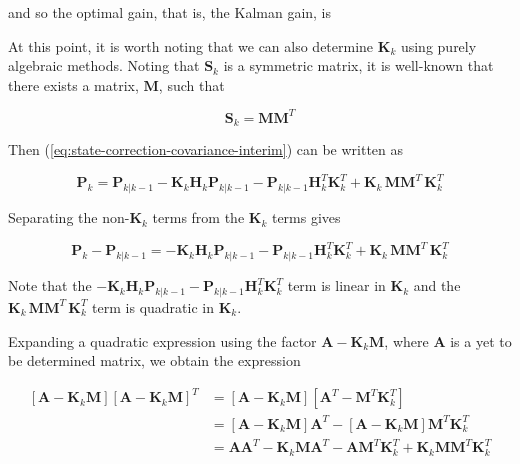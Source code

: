 \documentclass[12pt]{article}
\begin{document}
and so the optimal gain, that is, the Kalman gain, is


At this point, it is worth noting that we can also determine $\mathbf{K}_k$ using purely
algebraic methods. Noting that $\mathbf{S}_k$ is a symmetric matrix, it is well-known
that there exists a matrix, $\mathbf{M}$, such that

\begin{equation*}
    \mathbf{S}_{k} = \mathbf{M} \mathbf{M}^T
\end{equation*}

Then (\ref{eq:state-correction-covariance-interim}) can be written as

\begin{equation*}
    \mathbf{P}_{k} = \mathbf{P}_{k|k-1} - \mathbf{K}_k \mathbf{H}_k \mathbf{P}_{k|k-1} - \mathbf{P}_{k|k-1} \mathbf{H}_k^T \mathbf{K}_k^T
    + \mathbf{K}_k \, \mathbf{M} \mathbf{M}^T \, \mathbf{K}_k^T
\end{equation*}

Separating the non-$\mathbf{K}_k$ terms from the $\mathbf{K}_k$ terms gives

\begin{equation}
    \mathbf{P}_{k} - \mathbf{P}_{k|k-1} = - \mathbf{K}_k \mathbf{H}_k \mathbf{P}_{k|k-1} - \mathbf{P}_{k|k-1} \mathbf{H}_k^T \mathbf{K}_k^T
    + \mathbf{K}_k \, \mathbf{M} \mathbf{M}^T \, \mathbf{K}_k^T
    \label{eq:Pk-Pkm1}
\end{equation}

Note that the $- \mathbf{K}_k \mathbf{H}_k \mathbf{P}_{k|k-1} - \mathbf{P}_{k|k-1} \mathbf{H}_k^T \mathbf{K}_k^T$
term is linear in $\mathbf{K}_{k}$ and the $\mathbf{K}_k \, \mathbf{M} \mathbf{M}^T \, \mathbf{K}_k^T$
term is quadratic in $\mathbf{K}_{k}$.

Expanding a quadratic expression using the factor $\mathbf{A} - \mathbf{K}_k \mathbf{M}$,
where $\mathbf{A}$ is a yet to be determined matrix, we obtain the expression

\begin{equation*}
    \begin{aligned}
        \left[ \mathbf{A} - \mathbf{K}_k \mathbf{M} \right] \left[ \mathbf{A} - \mathbf{K}_k \mathbf{M} \right]^T
        &= \left[ \mathbf{A} - \mathbf{K}_k \mathbf{M} \right] \left[ \mathbf{A}^T - \mathbf{M}^T \mathbf{K}_k^T \right] \\
        &= \left[ \mathbf{A} - \mathbf{K}_k \mathbf{M} \right] \mathbf{A}^T - \left[ \mathbf{A} - \mathbf{K}_k \mathbf{M} \right] \mathbf{M}^T \mathbf{K}_k^T \\
        &= \mathbf{A} \mathbf{A}^T - \mathbf{K}_k \mathbf{M} \mathbf{A}^T - \mathbf{A} \mathbf{M}^T \mathbf{K}_k^T + \mathbf{K}_k \mathbf{M} \mathbf{M}^T \mathbf{K}_k^T
    \end{aligned}
\end{equation*}
\end{document}
